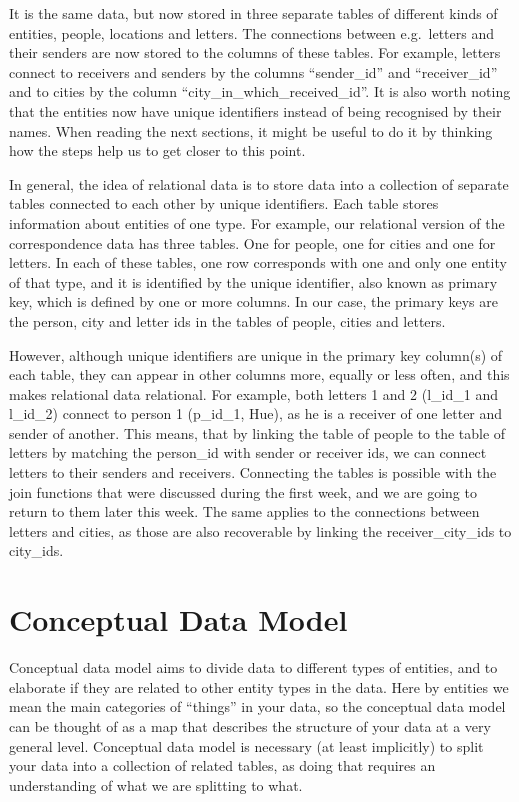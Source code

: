 \documentclass[
]{book}
\begin{document}
It is the same data, but now stored in three separate tables of different kinds of entities, people, locations and letters. The connections between e.g.~letters and their senders are now stored to the columns of these tables. For example, letters connect to receivers and senders by the columns ``sender\_id'' and ``receiver\_id'' and to cities by the column ``city\_in\_which\_received\_id''. It is also worth noting that the entities now have unique identifiers instead of being recognised by their names. When reading the next sections, it might be useful to do it by thinking how the steps help us to get closer to this point.

In general, the idea of relational data is to store data into a collection of separate tables connected to each other by unique identifiers. Each table stores information about entities of one type. For example, our relational version of the correspondence data has three tables. One for people, one for cities and one for letters. In each of these tables, one row corresponds with one and only one entity of that type, and it is identified by the unique identifier, also known as primary key, which is defined by one or more columns. In our case, the primary keys are the person, city and letter ids in the tables of people, cities and letters.

However, although unique identifiers are unique in the primary key column(s) of each table, they can appear in other columns more, equally or less often, and this makes relational data relational. For example, both letters 1 and 2 (l\_id\_1 and l\_id\_2) connect to person 1 (p\_id\_1, Hue), as he is a receiver of one letter and sender of another. This means, that by linking the table of people to the table of letters by matching the person\_id with sender or receiver ids, we can connect letters to their senders and receivers. Connecting the tables is possible with the join functions that were discussed during the first week, and we are going to return to them later this week. The same applies to the connections between letters and cities, as those are also recoverable by linking the receiver\_city\_ids to city\_ids.

\hypertarget{conceptual-data-model}{%
\section{Conceptual Data Model}\label{conceptual-data-model}}

Conceptual data model aims to divide data to different types of entities, and to elaborate if they are related to other entity types in the data. Here by entities we mean the main categories of ``things'' in your data, so the conceptual data model can be thought of as a map that describes the structure of your data at a very general level. Conceptual data model is necessary (at least implicitly) to split your data into a collection of related tables, as doing that requires an understanding of what we are splitting to what.
\end{document}
